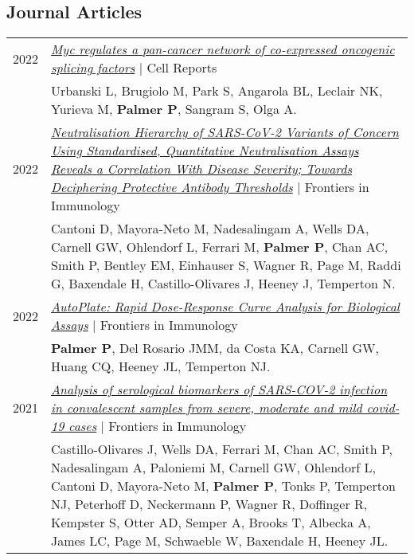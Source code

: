 \documentclass[letterpaper,11pt]{article}
\begin{document}
\subsection*{\textbf{Journal Articles}}
\begin{tabularx}{\linewidth}{@{}p{2cm}@{\hspace{5pt}}|@{\hspace{5pt}}X@{}}
    2022 & 
    \textit{\href{https://doi.org/10.1016/j.celrep.2022.111704}{\color{teal}Myc regulates a pan-cancer network of co-expressed oncogenic splicing factors}} $|$ Cell Reports \\
    & Urbanski L, Brugiolo M, Park S, Angarola BL, Leclair NK, Yurieva M, \textbf{Palmer P}, Sangram S, Olga A. \\
    
    2022 & 
    \textit{\href{https://doi.org/10.3389/fimmu.2022.773982}{\color{teal}Neutralisation Hierarchy of SARS-CoV-2 Variants of Concern Using Standardised, Quantitative Neutralisation Assays Reveals a Correlation With Disease Severity; Towards Deciphering Protective Antibody Thresholds}} $|$ Frontiers in Immunology \\
    & Cantoni D, Mayora-Neto M, Nadesalingam A, Wells DA, Carnell GW, Ohlendorf L, Ferrari M, \textbf{Palmer P}, Chan AC, Smith P, Bentley EM, Einhauser S, Wagner R, Page M, Raddi G, Baxendale H, Castillo-Olivares J, Heeney J, Temperton N. \\
    
    2022 & 
    \textit{\href{https://doi.org/10.3389/fimmu.2021.681636}{\color{teal}AutoPlate: Rapid Dose-Response Curve Analysis for Biological Assays}} $|$ Frontiers in Immunology \\
    & \textbf{Palmer P}, Del Rosario JMM, da Costa KA, Carnell GW, Huang CQ, Heeney JL, Temperton NJ. \\
    
    2021 & 
    \textit{\href{https://doi.org/10.3389/fimmu.2021.748291}{\color{teal}Analysis of serological biomarkers of SARS-COV-2 infection in convalescent samples from severe, moderate and mild covid-19 cases}} $|$ Frontiers in Immunology \\
    & Castillo-Olivares J, Wells DA, Ferrari M, Chan AC, Smith P, Nadesalingam A, Paloniemi M, Carnell GW, Ohlendorf L, Cantoni D, Mayora-Neto M, \textbf{Palmer P}, Tonks P, Temperton NJ, Peterhoff D, Neckermann P, Wagner R, Doffinger R, Kempster S, Otter AD, Semper A, Brooks T, Albecka A, James LC, Page M, Schwaeble W, Baxendale H, Heeney JL. \\
\end{tabularx}
\end{document}
